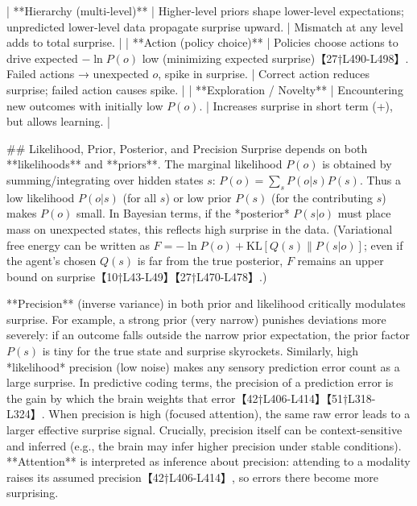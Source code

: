 \documentclass[a4paper]{article}
\begin{document}
    | **Hierarchy (multi-level)**            | Higher-level priors shape lower-level expectations; unpredicted lower-level data propagate surprise upward.                                                                                 | Mismatch at any level adds to total surprise.               |
    | **Action (policy choice)**             | Policies choose actions to drive expected \(-\ln P(o)\) low (minimizing expected surprise)【27†L490-L498】. Failed actions → unexpected \(o\), spike in surprise.                          | Correct action reduces surprise; failed action causes spike. |
    | **Exploration / Novelty**             | Encountering new outcomes with initially low \(P(o)\).                                                                                                                                        | Increases surprise in short term (+), but allows learning.    |
    
    ## Likelihood, Prior, Posterior, and Precision
    Surprise depends on both **likelihoods** and **priors**.  The marginal likelihood \(P(o)\) is obtained by summing/integrating over hidden states \(s\): \(P(o)=\sum_s P(o|s)P(s)\).  Thus a low likelihood \(P(o|s)\) (for all \(s\)) or low prior \(P(s)\) (for the contributing \(s\)) makes \(P(o)\) small.  In Bayesian terms, if the *posterior* \(P(s|o)\) must place mass on unexpected states, this reflects high surprise in the data.  (Variational free energy can be written as \(F=-\ln P(o)+\mathrm{KL}[Q(s)\|P(s|o)]\); even if the agent’s chosen \(Q(s)\) is far from the true posterior, \(F\) remains an upper bound on surprise【10†L43-L49】【27†L470-L478】.)
    
    **Precision** (inverse variance) in both prior and likelihood critically modulates surprise.  For example, a strong prior (very narrow) punishes deviations more severely: if an outcome falls outside the narrow prior expectation, the prior factor \(P(s)\) is tiny for the true state and surprise skyrockets.  Similarly, high *likelihood* precision (low noise) makes any sensory prediction error count as a large surprise.  In predictive coding terms, the precision of a prediction error is the gain by which the brain weights that error【42†L406-L414】【51†L318-L324】.  When precision is high (focused attention), the same raw error leads to a larger effective surprise signal.  Crucially, precision itself can be context-sensitive and inferred (e.g., the brain may infer higher precision under stable conditions).  **Attention** is interpreted as inference about precision: attending to a modality raises its assumed precision【42†L406-L414】, so errors there become more surprising.
    
\end{document}
